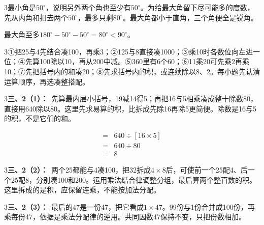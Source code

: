 \documentclass[multi=snippet,border={5bp 20bp 5bp 5bp}]{standalone}
\newenvironment{snippet}[3]{\begin{minipage}{#1bp}\color{answerred}\fontsize{#2}{#3}\selectfont\raggedright}{\end{minipage}}
\begin{document}
\begin{snippet}{505}{11.5}{14}\begin{multicols}{3}\raggedcolumns 最小角是\(50^\circ\)\allowbreak ，说明另外两个角也至少有\(50^\circ\)\allowbreak 。为给最大角留下尽可能多的度数，先从内角和扣去两个\(50^\circ\)\allowbreak ，最多只剩\(80^\circ\)\allowbreak 。最大角都小于直角，三个角便全是锐角。\par 最大角至多\(180^\circ-50^\circ-50^\circ=80^\circ<90^\circ\)\allowbreak 。\end{multicols}\end{snippet}
\begin{snippet}{505}{11.5}{14}\begin{multicols}{3}\raggedcolumns ①把25与4先结合凑100，再乘3；②125与8直接凑1000；③乘10时各数位向左进一位；④先算100除以10，再从200中减。⑤360里有6个60；⑥11乘20可先乘2再乘10；⑦先把括号内的和凑20；⑧先求括号内的积，或连续除以8、2。每小题先认清运算顺序，再选凑整搭配。\end{multicols}\end{snippet}
\begin{snippet}{505}{11.5}{14}\begin{multicols}{3}\raggedcolumns \textbf{三、2（1）：}\ 先算最内层小括号，19减14得5；再把16与5相乘凑成整十除数80，直接用640除以80。这里先求易算的积，比拆成先除16再除5更简便。除数是16与5的积，不是它们的和。\end{multicols}\end{snippet}
\begin{snippet}{176.445529683431}{10.5}{12.8}\SourceSans\setlength{\mathindent}{2bp}\[\begin{aligned}={}&640\div[16\times5]\\={}&640\div80\\={}&8\end{aligned}\]\end{snippet}
\begin{snippet}{505}{11.5}{14}\begin{multicols}{3}\raggedcolumns \textbf{三、2（2）：}\ 两个25都能与4凑100，把32拆成\(4\times8\)\allowbreak 后，可使前一个25配4、后一个25配8，分别凑100和200。运用乘法结合律调整分组，最后算两个整百数的积。这里拆成的是积，应保留连乘，不能按加法分配。\end{multicols}\end{snippet}
\begin{snippet}{505}{11.5}{14}\begin{multicols}{3}\raggedcolumns \textbf{三、2（3）：}\ 最后的47是一份47，把它看成\(1\times47\)\allowbreak 。99份与1份合并成100份，再乘每份47，依据是乘法分配律的逆用。共同因数47保持不变，只把份数相加。\end{multicols}\end{snippet}
\end{document}

